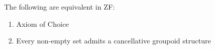 \documentclass[../../main.tex]{subfiles}
\begin{document}
\begin{theorem}\cite{Haj72}
    The following are equivalent in ZF:
    \begin{enumerate}
        \item Axiom of Choice
        \item Every non-empty set admits a cancellative groupoid structure
    \end{enumerate}
\end{theorem}
\end{document}
